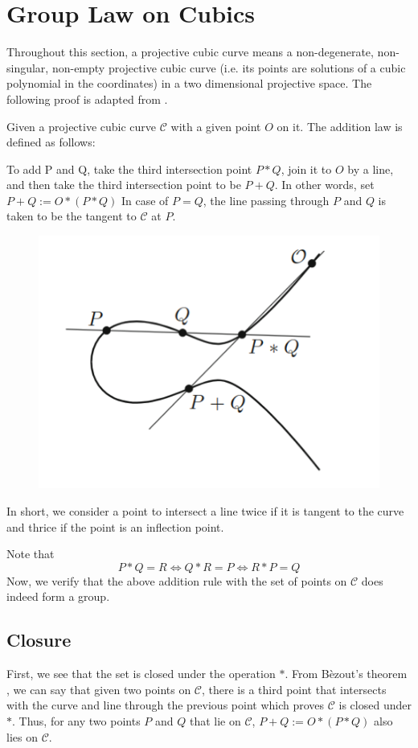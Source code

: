\section{Group Law on Cubics}

Throughout this section, a projective cubic curve means a non-degenerate,
non-singular, non-empty projective cubic curve (i.e. its points are solutions of
a cubic polynomial in the coordinates) in a two dimensional projective
space. The following proof is adapted from \cite{silver}.

\vspace{1ex}

\noindent
Given a projective cubic curve $\mathcal{C}$ with a given point $O$ on it.
The addition law is defined as follows:

To add P and Q, take the third intersection point $P*Q$, join it to $O$ by a line, and then take the third intersection point to be $P+Q$. In other words, set $P + Q := O*(P*Q)$
In case of $P=Q$, the line passing through $P$ and $Q$ is taken to be the tangent to $\mathcal{C}$ at $P$.

\begin{figure}[H]
  \centering
  \includegraphics[width=0.5\linewidth]{pictures/Grouplaw.png}
\end{figure}

In short, we consider a point to intersect a line twice if it is tangent to the curve and thrice if the point is an inflection point. 

\noindent
Note that
\[P*Q=R \iff Q*R=P \iff R*P=Q\]
Now, we verify that the above addition rule with the set of points on $\mathcal{C}$ does indeed form a group.

\subsection*{Closure}
First, we see that the set is closed under the operation $*$.
From B\`ezout's theorem \cite[Thm.~A.1]{silver}, we can say that given two points on $\mathcal{C}$, there is a third point that intersects with the curve and line through the previous point which proves $\mathcal{C}$ is closed under $*$.
Thus, for any two points $P$ and $Q$ that lie on $\mathcal{C}$, $P+Q := O*(P*Q)$ also lies on $\mathcal{C}$.

